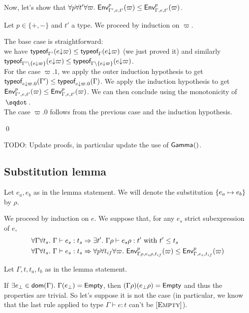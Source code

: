 \documentclass[a4paper]{article}
\theoremstyle{definition}
\begin{document}
        Now, let's show that $\forall p \forall t' \forall \varpi.\ \Gp p {\Gamma',e,t'} (\varpi) \leq \Gp p {\Gamma,e,t'} (\varpi)$.
    
        Let $p\in \{+,-\}$ and $t'$ a type.
        We proceed by induction on $\varpi$.
        
        The base case is straightforward:\\
        we have $\tyof {\occ e \varpi} {\Gamma'} \leq \tyof {\occ e \varpi} {\Gamma}$ (we just proved it)
        and similarly $\tyof {\occ e \varpi} {\Gamma'\setminus\{\occ e \varpi\}} \leq \tyof {\occ e \varpi} {\Gamma\setminus\{\occ e \varpi\}}$.\\
        For the case $\varpi.1$, we apply the outer induction hypothesis to get $\tyof {\Gamma'} {\occ e {\varpi.0}} \leq \tyof {\Gamma} {\occ e {\varpi.0}}$.
        We apply the induction hypothesis to get $\Gp p {\Gamma',e,t'} (\varpi) \leq \Gp p {\Gamma,e,t'} (\varpi)$. We can then conclude using the monotonicity of $\worra {} {}$.\\
        The case $\varpi.0$ follows from the previous case and the induction hypothesis.
    
        \qed

        TODO: Update proofs, in particular update the use of $\Genv {} {}$.
    
        \subsection{Substitution lemma}
    
        Let $e_a,e_b$ as in the lemma statement. We will denote the substitution $\subst {e_a} {e_b}$ by $\rho$.
    
        We proceed by induction on $e$. We suppose that, for any $e_s$ strict subexpression of $e$,
        \begin{align*}
          \forall \Gamma \forall t_s.\ &\Gamma \vdash e_s:t_s \Rightarrow \exists t'.\ \Gamma \rho \vdash e_s \rho:t' \text{ with } t'\leq t_s\\
          \forall \Gamma \forall t_s.\ &\Gamma \vdash e_s:t_s \Rightarrow \forall p \forall t_{if} \forall \varpi.\ \Gp p {\Gamma\rho,e_s\rho,t_{if}} (\varpi) \leq \Gp p {\Gamma,e_s,t_{if}} (\varpi)
        \end{align*}
    
        Let $\Gamma,t,t_a,t_b$ as in the lemma statement.
    
        If $\exists e_\bot \in \dom {\Gamma}.\ \Gamma(e_\bot) = \Empty$, then $(\Gamma\rho)(e_\bot\rho) = \Empty$ and thus the properties are trivial.
        So let's suppose it is not the case (in particular, we know that the last rule applied to type $\Gamma \vdash e:t$ can't be $\Rule{Empty}$).
    
\end{document}
